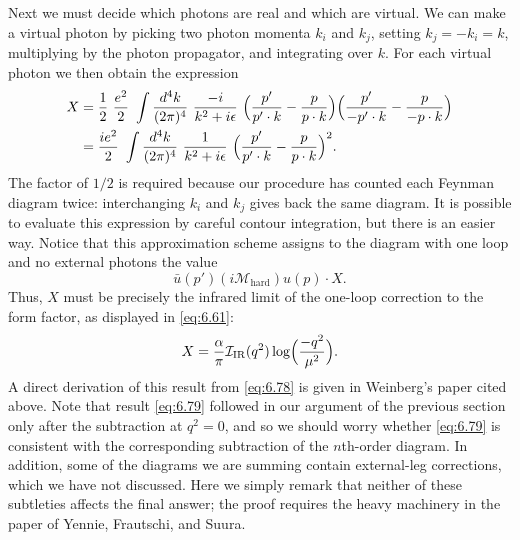 Next we must decide which photons are real and which are virtual.  We can make
a virtual photon by picking two photon momenta $k_i$ and $k_j$, setting
$k_j = -k_i = k$, multiplying by the photon propagator, and integrating over
$k$.  For each virtual photon we then obtain the expression
\begin{equation}
  \begin{aligned}
    X &= \frac{1}{2}\ \frac{e^2}{2}\ \int \frac{d^4k}{(2\pi)^4}\
      \frac{-i}{k^2+i\epsilon}\ \Bigl( \frac{p'}{p'\cdot k}
        - \frac{p}{p\cdot k} \Bigr)\Bigl( \frac{p'}{-p'\cdot k}
          - \frac{p}{-p\cdot k} \Bigr)\\
    &= \frac{ie^2}{2}\ \int \frac{d^4k}{(2\pi)^4}\ \frac{1}{k^2+i\epsilon}\
      \Bigl( \frac{p'}{p'\cdot k} - \frac{p}{p\cdot k} \Bigr)^2 .
  \end{aligned}
  \label{eq:6.78}
\end{equation}
The factor of $1/2$ is required because our procedure has counted each Feynman
diagram twice: interchanging $k_i$ and $k_j$ gives back the same diagram.  It
is possible to evaluate this expression by careful contour integration, but
there is an easier way.  Notice that this approximation scheme assigns to the
diagram with one loop and no external photons the value
\begin{equation}
  \bar{u}(p')(i\mathcal{M}_{\mathrm{hard}})u(p)\cdot X .
\end{equation}
Thus, $X$ must be precisely the infrared limit of the one-loop correction to
the form factor, as displayed in \eqref{eq:6.61}:
\begin{equation}
  X = \frac{\alpha}{\pi}\mathcal{I}_{\mathrm{IR}}(q^2)\log\Bigl(
    \frac{-q^2}{\mu^2} \Bigr) .
  \label{eq:6.79}
\end{equation}
A direct derivation of this result from \eqref{eq:6.78} is given in Weinberg's
paper cited above.  Note that result \eqref{eq:6.79} followed in our argument
of the previous section only after the subtraction at $q^2 = 0$, and so we
should worry whether \eqref{eq:6.79} is consistent with the corresponding
subtraction of the $n$th-order diagram.  In addition, some of the diagrams we
are summing contain external-leg corrections, which we have not discussed.
Here we simply remark that neither of these subtleties affects the final
answer; the proof requires the heavy machinery in the paper of Yennie,
Frautschi, and Suura.

